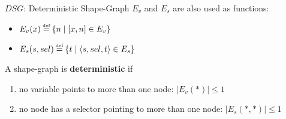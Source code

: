 \documentclass[xcolor={usenames,dvipsnames}]{beamer}
\newcommand\defeq{\stackrel{\mathclap{\tiny\mbox{def}}}{=}}
\begin{document}
\begin{frame}[fragile]{$DSG$: Deterministic Shape-Graph}
  $E_v$ and $E_s$ are also used as functions:
  \begin{itemize}
  \item $E_v(x) \defeq \left\{ n \mid \left[x, n\right] \in E_v \right\}$
  \item $E_s(s, sel) \defeq \left\{ t \mid \langle s, sel, t \rangle \in E_s \right\}$
  \end{itemize}
  
  \vspace{1em}
  
  A shape-graph is \textbf{deterministic} if
  \begin{enumerate}
  \item no variable points to more than one node: $ |E_v(*)| \leq 1$
  \item no node has a selector pointing to more than one node: $ |E_s(*, *)| \leq 1$ 
  \end{enumerate}
\end{frame}
\end{document}
